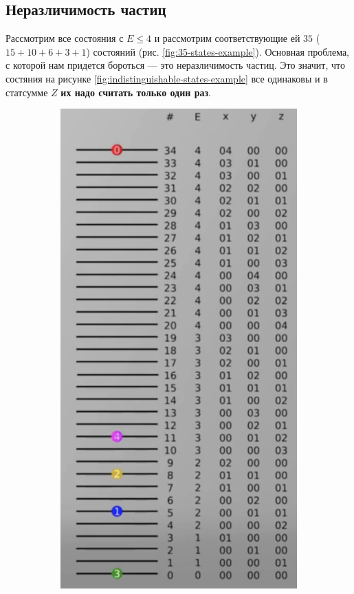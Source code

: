 \subsection{Неразличимость частиц}
Рассмотрим все состояния с $E \leq 4$ и рассмотрим соответствующие ей $35$ ($15+10+6+3+1$) состояний (рис. \ref{fig:35-states-example}).
Основная проблема, с которой нам придется бороться --- это неразличимость частиц.
Это значит, что состяния на рисунке \ref{fig:indistinguishable-states-example} все одинаковы и в статсумме $Z$ \textbf{их надо считать только один раз}.

\begin{figure}[ht]
    \begin{subfigure}{0.33\columnwidth}
        \centering\includegraphics[width=\linewidth]{fig/35-states}

\end{subfigure}
\end{figure}
